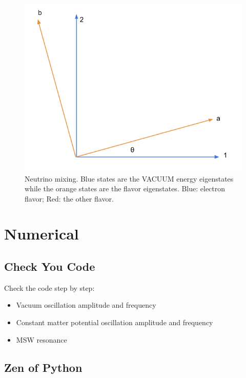 \documentclass{sciposter}
\begin{document}
\begin{multicols}{3}
\begin{figure}
\centering
\includegraphics[width=\columnwidth]{assets/neutrinoMixingAngle.png}
\caption{Neutrino mixing. Blue states are the VACUUM energy eigenstates while the orange states are the flavor eigenstates. Blue: electron flavor; Red: the other flavor.}
\label{fig:neutrinoMixingAngle}
\end{figure}





\section{Numerical}

\subsection{Check You Code}
Check the code step by step:

\begin{itemize}
\item Vacuum oscillation amplitude and frequency
\item Constant matter potential oscillation amplitude and frequency
\item MSW resonance
\end{itemize}


\subsection{Zen of Python}


\end{multicols}
\end{document}
